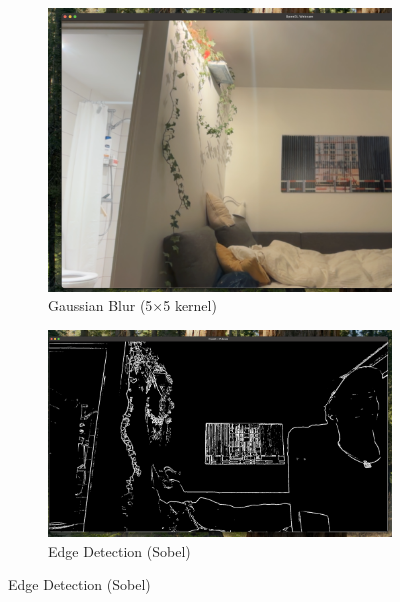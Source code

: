 \documentclass[12pt,a4paper]{article}
\begin{document}
\begin{figure}[H]
    \begin{subfigure}[b]{0.20\textwidth}
        \centering
        \includegraphics[width=\textwidth]{filters/gblur.png}
        \caption{Gaussian Blur (5×5 kernel)}
        \label{fig:filter_blur}
    \end{subfigure}
    \hfill
    \begin{subfigure}[b]{0.20\textwidth}
        \centering
        \includegraphics[width=\textwidth]{filters/edge.png}
        \caption{Edge Detection (Sobel)}
        \label{fig:filter_edge}
    \end{subfigure}

    \vspace{0.1cm}


\end{figure}
\end{document}
